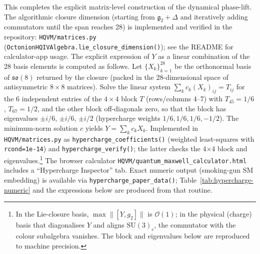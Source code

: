 \documentclass[12pt,a4paper]{article}
\begin{document}
This completes the explicit matrix-level construction of the dynamical phase-lift. The algorithmic closure dimension (starting from \(\mathfrak{g}_2 + \Delta\) and iteratively adding commutators until the span reaches 28) is implemented and verified in the repository: \texttt{HQVM/matrices.py} (\texttt{OctonionHQIVAlgebra.lie\_closure\_dimension()}); see the README for calculator-app usage. The explicit expression of \(Y\) as a linear combination of the 28 basis elements is computed as follows. Let \(\{X_k\}_{k=1}^{28}\) be the orthonormal basis of \(\mathfrak{so}(8)\) returned by the closure (packed in the 28-dimensional space of antisymmetric \(8\times8\) matrices). Solve the linear system \(\sum_k c_k (X_k)_{ij} = T_{ij}\) for the 6 independent entries of the \(4\times4\) block \(T\) (rows/columns 4--7) with \(T_{45} = 1/6\), \(T_{67} = 1/2\), and the other block off-diagonals zero, so that the block has eigenvalues \(\pm i/6\), \(\pm i/6\), \(\pm i/2\) (hypercharge weights \(1/6, 1/6, 1/6, -1/2\)). The minimum-norm solution \(c\) yields \(Y = \sum_k c_k X_k\). Implemented in \texttt{HQVM/matrices.py} as \texttt{hypercharge\_coefficients()} (weighted least-squares with \texttt{rcond=1e-14}) and \texttt{hypercharge\_verify()}; the latter checks the 4\(\times\)4 block and eigenvalues.\footnote{In the Lie-closure basis, \(\max\|[Y,g_2]\|\) is \(\mathcal{O}(1)\); in the physical (charge) basis that diagonalises \(Y\) and aligns \(\mathrm{SU}(3)_c\), the commutator with the colour subalgebra vanishes. The block and eigenvalues below are reproduced to machine precision.} The browser calculator \texttt{HQVM/quantum\_maxwell\_calculator.html} includes a ``Hypercharge Inspector'' tab. Exact numeric output (smoking-gun SM embedding) is available via \texttt{hypercharge\_paper\_data()}; Table~\ref{tab:hypercharge-numeric} and the expressions below are produced from that routine.
\end{document}
